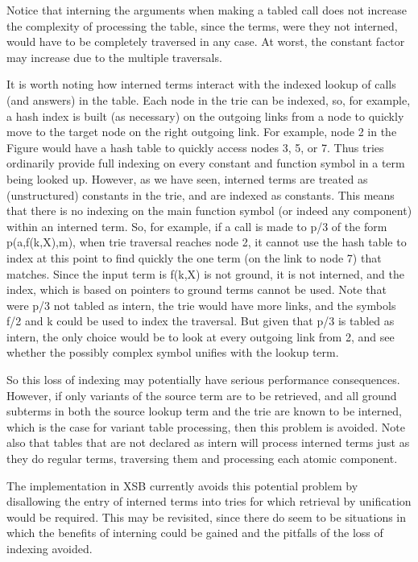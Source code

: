 \documentclass{llncs}
\begin{document}
Notice that interning the arguments when making a tabled call does not
increase the complexity of processing the table, since the terms, were
they not interned, would have to be completely traversed in any case.
At worst, the constant factor may increase due to the multiple
traversals.

It is worth noting how interned terms interact with the indexed lookup
of calls (and answers) in the table.  Each node in the trie can be
indexed, so, for example, a hash index is built (as necessary) on the
outgoing links from a node to quickly move to the target node on the
right outgoing link.  For example, node 2 in the Figure would have a
hash table to quickly access nodes 3, 5, or 7.  Thus tries ordinarily
provide full indexing on every constant and function symbol in a term
being looked up.  However, as we have seen, interned terms are treated
as (unstructured) constants in the trie, and are indexed as constants.
This means that there is no indexing on the main function symbol (or
indeed any component) within an interned term.  So, for example, if a
call is made to p/3 of the form p(a,f(k,X),m), when trie traversal
reaches node 2, it cannot use the hash table to index at this point to
find quickly the one term (on the link to node 7) that matches.  
Since the input term is f(k,X) is not ground, it is not interned, and
the index, which is based on pointers to ground terms cannot be used.
Note that were p/3 not tabled as intern, the trie would have more
links, and the symbols f/2 and k could be used to index the
traversal.  But given that p/3 is tabled as intern, the only choice
would be to look at every outgoing link from 2, and see whether the
possibly complex symbol unifies with the lookup term.

So this loss of indexing may potentially have serious performance
consequences.  However, if only variants of the source term are to be
retrieved, and all ground subterms in both the source lookup term and
the trie are known to be interned, which is the case for variant table
processing, then this problem is avoided.  Note also that tables that
are not declared as intern will process interned terms just as they do
regular terms, traversing them and processing each atomic component.

The implementation in XSB currently avoids this potential problem by
disallowing the entry of interned terms into tries for which retrieval
by unification would be required.  This may be revisited, since there
do seem to be situations in which the benefits of interning could be
gained and the pitfalls of the loss of indexing avoided.
\end{document}
